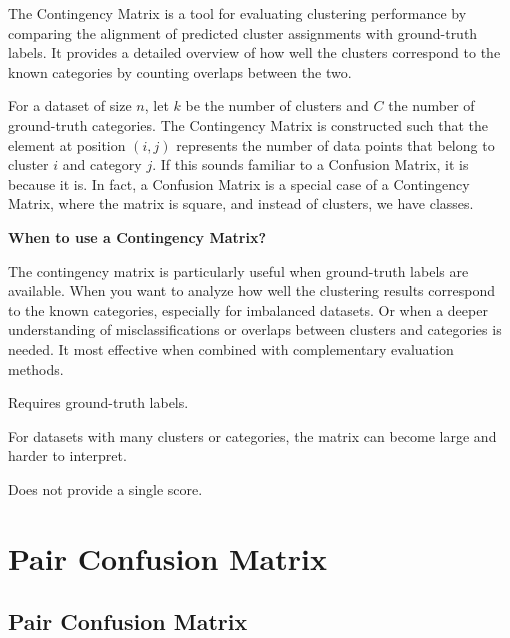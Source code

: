 The Contingency Matrix is a tool for evaluating clustering performance by comparing the alignment of predicted cluster
assignments with ground-truth labels. It provides a detailed overview of how well the clusters correspond to the known
categories by counting overlaps between the two.

For a dataset of size $n$, let $k$ be the number of clusters and $C$ the number of ground-truth categories.
The Contingency Matrix is constructed such that the element at position  $(i,j)$ represents the number of data points that belong
to cluster $i$ and category $j$. If this sounds familiar to a Confusion Matrix, it is because it is. In fact, a Confusion Matrix
is a special case of a Contingency Matrix, where the matrix is square, and instead of clusters, we have classes.

\textbf{When to use a Contingency Matrix?}

The contingency matrix is particularly useful when ground-truth labels are available. When you want to analyze how well the
clustering results correspond to the known categories, especially for imbalanced datasets. Or when a deeper understanding
of misclassifications or overlaps between clusters and categories is needed. It most effective when combined with
complementary evaluation methods.

{
    \item Requires ground-truth labels.
    \item For datasets with many clusters or categories, the matrix can become large and harder to interpret.
    \item Does not provide a single score.
}

\clearpage
\thispagestyle{clusteringstyle}
\section{Pair Confusion Matrix}
\subsection{Pair Confusion Matrix}

